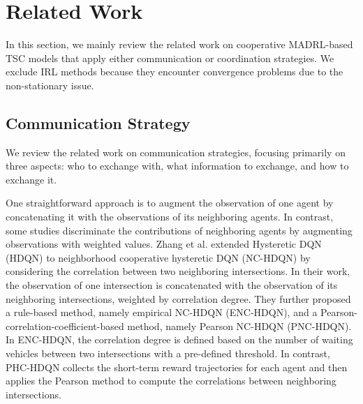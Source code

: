 \section{Related Work}
\label{sec: related work}
In this section, we mainly review the related work on cooperative MADRL-based TSC models that apply either communication or coordination strategies. We exclude IRL methods because they encounter convergence problems due to the non-stationary issue.

\subsection{Communication Strategy}
We review the related work on communication strategies, focusing primarily on three aspects: who to exchange with, what information to exchange, and how to exchange it.

One straightforward approach is to augment the observation of one agent by concatenating it with the observations of its neighboring agents\cite{arel2010reinforcement}. In contrast, some studies discriminate the contributions of neighboring agents by augmenting observations with weighted values.
Zhang et al. extended Hysteretic DQN (HDQN)\cite{omidshafiei2017deep} to neighborhood cooperative hysteretic DQN (NC-HDQN) by considering the correlation between two neighboring intersections\cite{zhang2022neighborhood}. In their work, the observation of one intersection is concatenated with the observation of its neighboring intersections, weighted by correlation degree. They further proposed a rule-based method, namely empirical NC-HDQN (ENC-HDQN), and a Pearson-correlation-coefficient-based method, namely Pearson NC-HDQN (PNC-HDQN). In ENC-HDQN, the correlation degree is defined based on the number of waiting vehicles between two intersections with a pre-defined threshold.  In contrast, PHC-HDQN collects the short-term reward trajectories for each agent and then applies the Pearson method to compute the correlations between neighboring intersections.  

